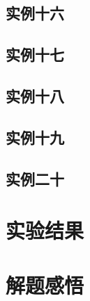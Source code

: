 \documentclass[a4paper]{article}
\begin{document}
\subsection{实例十六}
\subsection{实例十七}
\subsection{实例十八}
\subsection{实例十九}
\subsection{实例二十}
\section{实验结果}
\section{解题感悟}
\end{document}
